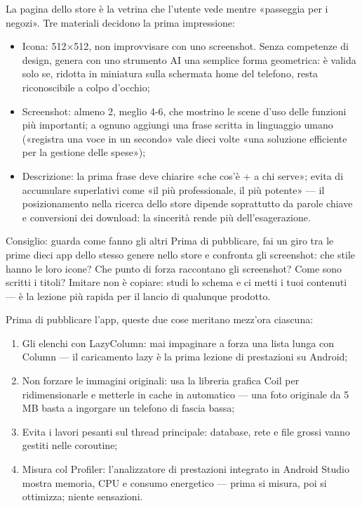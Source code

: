 
La pagina dello store è la vetrina che l'utente vede mentre «passeggia per i negozi». Tre materiali decidono la prima impressione:

\begin{itemize}
  \item Icona: 512×512, non improvvisare con uno screenshot. Senza competenze di design, genera con uno strumento AI una semplice forma geometrica: è valida solo se, ridotta in miniatura sulla schermata home del telefono, resta riconoscibile a colpo d'occhio;
  \item Screenshot: almeno 2, meglio 4-6, che mostrino le scene d'uso delle funzioni più importanti; a ognuno aggiungi una frase scritta in linguaggio umano («registra una voce in un secondo» vale dieci volte «una soluzione efficiente per la gestione delle spese»);
  \item Descrizione: la prima frase deve chiarire «che cos'è + a chi serve»; evita di accumulare superlativi come «il più professionale, il più potente» — il posizionamento nella ricerca dello store dipende soprattutto da parole chiave e conversioni dei download: la sincerità rende più dell'esagerazione.
\end{itemize}

\begin{tcbinfo}{Consiglio: guarda come fanno gli altri}
Prima di pubblicare, fai un giro tra le prime dieci app dello stesso genere nello store e confronta gli screenshot: che stile hanno le loro icone? Che punto di forza raccontano gli screenshot? Come sono scritti i titoli? Imitare non è copiare: studi lo schema e ci metti i tuoi contenuti — è la lezione più rapida per il lancio di qualunque prodotto.

\end{tcbinfo}


Prima di pubblicare l'app, queste due cose meritano mezz'ora ciascuna:


\begin{enumerate}
  \item Gli elenchi con LazyColumn: mai impaginare a forza una lista lunga con Column — il caricamento lazy è la prima lezione di prestazioni su Android;
  \item Non forzare le immagini originali: usa la libreria grafica Coil per ridimensionarle e metterle in cache in automatico — una foto originale da 5 MB basta a ingorgare un telefono di fascia bassa;
  \item Evita i lavori pesanti sul thread principale: database, rete e file grossi vanno gestiti nelle coroutine;
  \item Misura col Profiler: l'analizzatore di prestazioni integrato in Android Studio mostra memoria, CPU e consumo energetico — prima si misura, poi si ottimizza; niente sensazioni.
\end{enumerate}

